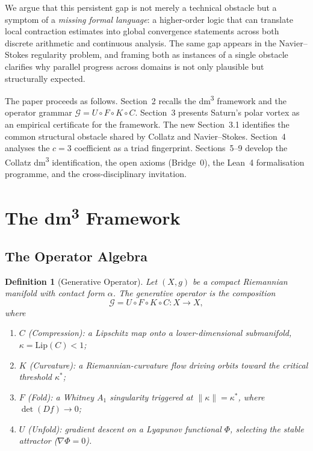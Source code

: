 \documentclass[11pt,a4paper]{article}
\newtheorem{definition}[theorem]{Definition}
\begin{document}
We argue that this persistent gap is not merely a technical obstacle
but a symptom of a \emph{missing formal language}: a higher-order logic
that can translate local contraction estimates into global convergence
statements across both discrete arithmetic and continuous analysis.
The same gap appears in the Navier--Stokes regularity problem, and
framing both as instances of a single obstacle clarifies why parallel
progress across domains is not only plausible but structurally expected.

The paper proceeds as follows.
Section~2 recalls the dm\textsuperscript{3} framework and the operator
grammar $\mathcal{G} = U \circ F \circ K \circ C$.
Section~3 presents Saturn's polar vortex as an empirical certificate
for the framework.
The new Section~3.1 identifies the common structural obstacle shared by
Collatz and Navier--Stokes.
Section~4 analyses the $c = 3$ coefficient as a triad fingerprint.
Sections~5--9 develop the Collatz dm\textsuperscript{3} identification,
the open axioms (Bridge~0), the Lean~4 formalisation programme, and
the cross-disciplinary invitation.

\section{The dm\textsuperscript{3} Framework}

\subsection{The Operator Algebra}

\begin{definition}[Generative Operator]
Let $(X, g)$ be a compact Riemannian manifold with contact form
$\alpha$.  The \emph{generative operator} is the composition
\[
  \mathcal{G} = U \circ F \circ K \circ C : X \to X,
\]
where
\begin{enumerate}[label=(\roman*)]
  \item $C$ (\emph{Compression}): a Lipschitz map onto a
        lower-dimensional submanifold, $\kappa = \mathrm{Lip}(C) < 1$;
  \item $K$ (\emph{Curvature}): a Riemannian-curvature flow driving
        orbits toward the critical threshold $\kappa^*$;
  \item $F$ (\emph{Fold}): a Whitney $A_1$ singularity triggered at
        $\|\kappa\| = \kappa^*$, where $\det(Df) \to 0$;
  \item $U$ (\emph{Unfold}): gradient descent on a Lyapunov functional
        $\Phi$, selecting the stable attractor ($\nabla\Phi = 0$).
\end{enumerate}
\end{definition}
\end{document}
